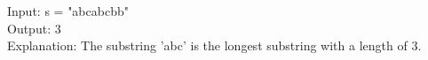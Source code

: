 \documentclass[preview]{standalone}
\begin{document}
Input: s = "abcabcbb"\\Output: 3\\Explanation: The substring 'abc' is the longest substring with a length of 3.\\
\end{document}
